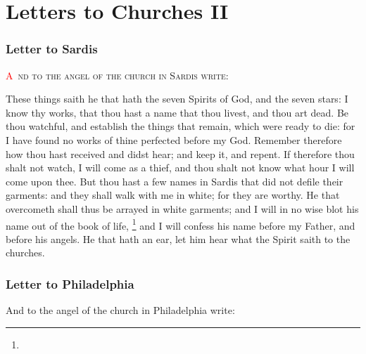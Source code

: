 \chapter{Letters to Churches II}
\fancyhead{} %
\subsection*{Letter to Sardis}
\lettrine[lines=3]{\textcolor{red}{A}}{\ nd to the angel of the church in Sardis write:}

\zz These things saith he that hath the seven Spirits of God, and the seven stars: I know thy works, that thou hast a name that thou livest, and thou art dead. %
Be thou watchful, and establish the things that remain, which were ready to die: for I have found no works of thine perfected before my God. %
Remember therefore how thou hast received and didst hear; and keep it, and repent. If therefore thou shalt not watch, I will come as a thief, and thou shalt not know what hour I will come upon thee. %
But thou hast a few names in Sardis that did not defile their garments: and they shall walk with me in white; for they are worthy. %
He that overcometh shall thus be arrayed in white garments; and I will in no wise blot his name out of the book of life,%
	\footnote{ %
			} %
and I will confess his name before my Father, and before his angels. %
He that hath an ear, let him hear what the Spirit saith to the churches.
\subsection*{Letter to Philadelphia}
And to the angel of the church in Philadelphia write:

